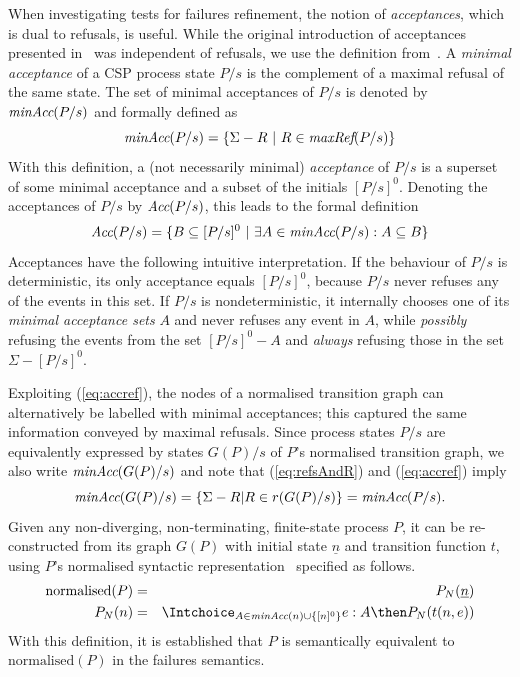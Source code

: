 \documentclass[3p,times]{elsarticle}
\newcommand{\ii}[1]{\underline{#1}}
\newcommand{\accs}{\text{\it Acc}}
\newcommand{\minaccs}{\text{\it minAcc}}
\newcommand{\maxrefs}{\text{\it maxRef}}
\begin{document}
When investigating tests for failures refinement, the notion of
\emph{acceptances}, which is dual to refusals, is useful. While the
original introduction of acceptances presented
in~\cite[pp.~75]{Hennessy:1988:ATP:50497} was independent of refusals, we use
the definition from~\cite[pp.~278]{Roscoe:1997:TPC:550448}.   A \emph{minimal
acceptance} of a CSP process state $P/s$ is the complement of a maximal
refusal of the same state. The set of minimal acceptances of $P/s$ is denoted
by $\minaccs(P/s)$ and formally defined as
%
\begin{equation}\label{eq:accref}
\minaccs(P/s) = \{ \Sigma - R~|~R\in \maxrefs(P/s)  \}
\end{equation}
%
With this definition, a (not necessarily minimal) \emph{acceptance} of $P/s$ is a superset of some minimal acceptance and a subset of the initials $[P/s]^0$. Denoting the acceptances of $P/s$ by $\accs(P/s)$, this leads to the formal definition
\begin{equation}
\label{eq:accrefall}
\accs(P/s)  = \{ B\subseteq [P/s]^0~|~\exists A\in\minaccs(P/s):  A \subseteq B   \}
\end{equation}
%
Acceptances have the following intuitive interpretation.  If the behaviour of
$P/s$ is deterministic, its only acceptance equals $[P/s]^0$, because $P/s$
never refuses any of the events in this set. If $P/s$ is nondeterministic, it
internally chooses one of its \emph{minimal acceptance sets} $A$ and never
refuses any event in $A$, while {\it possibly} refusing the events from the
set $[P/s]^0 - A$ and {\it always} refusing those in the set $\Sigma -
[P/s]^0$.

Exploiting (\ref{eq:accref}), the nodes of a normalised transition graph can
alternatively be labelled with minimal acceptances; this captured the same
information conveyed by maximal refusals. Since process states $P/s$ are
equivalently expressed by states $G(P)/s$ of $P$'s normalised transition
graph, we also write $\minaccs(G(P)/s)$ and note that (\ref{eq:refsAndR}) and
(\ref{eq:accref}) imply
\begin{equation}\label{eq:maxrefsminaccs}
\minaccs(G(P)/s) = \{ \Sigma - R | R\in r(G(P)/s) \} = \minaccs(P/s).
\end{equation}
%
Given any non-diverging, non-terminating, finite-state process $P$, it can be
re-con\-struc\-ted from its graph $G(P)$ with initial state $\ii
n$ and transition function $t$, using $P$'s normalised syntactic
representation~\cite[pp.~277]{Roscoe:1997:TPC:550448} specified as follows.
\begin{eqnarray*}
\text{normalised}(P) & = & P_N(\ii n)
\\
P_N(n) & = & \Intchoice_{A\in\minaccs(n)\cup \{ [n]^0 \} } e:A\then P_N(t(n,e))
\end{eqnarray*}
With this definition, it is established that $P$ is semantically equivalent
to $\text{normalised}(P)$ in the failures semantics.
\end{document}
